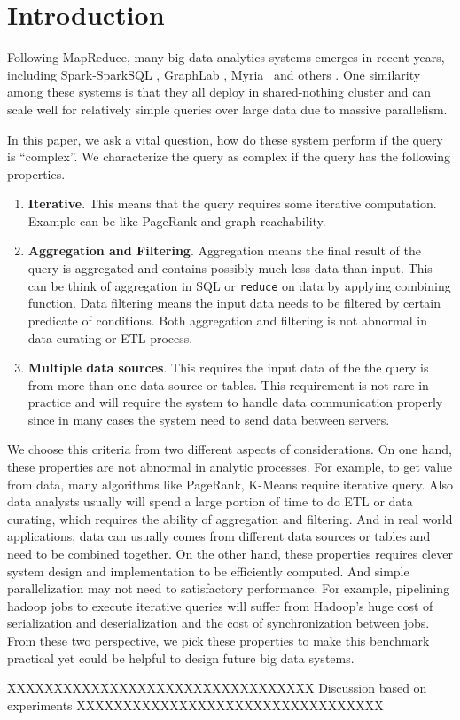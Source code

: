 \section{Introduction}

Following MapReduce, many big data analytics systems emerges in recent years, 
including Spark-SparkSQL \cite{XinRZFSS13SIGMOD, ZahariaCDDMMFSS12NSDI}, 
GraphLab \cite{GonzalezLGBG12OSDI}, Myria~\cite{HalperinACCKMORWWXBHS14SIGMOD} 
and others \cite{AbouzeidBARS09PVLDB,ThusooSJSCZALM10ICDE}. One similarity 
among these systems is that they all deploy in shared-nothing cluster and can 
scale well for relatively simple queries over large data due to massive 
parallelism. 

In this paper, we ask a vital question, how do these system perform if the
query is ``complex''. We characterize the query as complex if the query has 
the following properties.

\begin{enumerate}

\item \textbf{Iterative}. This means that the query requires some
iterative computation. Example can be like PageRank and graph reachability. 

\item \textbf{Aggregation and Filtering}. Aggregation means the final
result of the query is aggregated and contains possibly much less data
than input. This can be think of aggregation in SQL or \texttt{reduce} on data
by applying combining function. Data filtering means the input data needs to be
filtered by certain predicate of conditions. Both aggregation and filtering is 
not abnormal in data curating or ETL process.

\item \textbf{Multiple data sources}. This requires the input data of the 
the query is from more than one data source or tables. This requirement is not
rare in practice and will require the system to handle data communication
properly since in many cases the system need to send data between servers.

\end{enumerate}

We choose this criteria from two different aspects of considerations. On one
 hand, these properties are not abnormal in analytic processes.
  For example, to 
get value from data, many algorithms like PageRank, K-Means require iterative
query. Also data analysts usually will spend a large portion of time to do ETL
or data curating, which requires the ability of aggregation and filtering. And 
in real world applications, data can usually comes from different data 
sources or tables and need to be combined together. On the other hand, these
properties requires clever system design and implementation to be efficiently
computed. And simple parallelization may not need to satisfactory 
performance. For example, pipelining hadoop jobs to execute iterative 
queries will suffer from Hadoop's huge cost of serialization and 
deserialization and the cost of synchronization between jobs. From these two 
perspective, we pick these properties to make this benchmark practical yet 
could be helpful to design future big data systems. 

XXXXXXXXXXXXXXXXXXXXXXXXXXXXXXXXX
Discussion based on experiments
XXXXXXXXXXXXXXXXXXXXXXXXXXXXXXXXX

